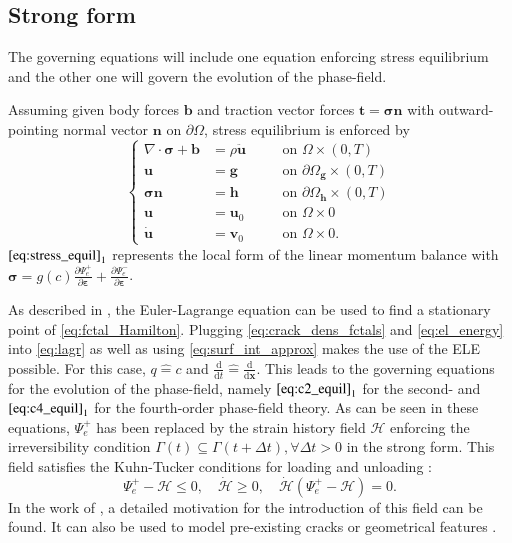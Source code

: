 \subsection{Strong form} \label{sec:strong_form}
The governing equations will include one equation enforcing stress equilibrium and the other one will govern the evolution of the phase-field.

Assuming given body forces $\mathbf{b}$ and traction vector forces $\mathbf{t}=\bm{\sigma}\mathbf{n}$ with outward-pointing normal vector $\mathbf{n}$ on $\partial\Omega$, stress equilibrium is enforced by
\begin{equation} \label{eq:stress_equil}
	 \left\{\begin{alignedat}{2}
\nabla\cdot\bm{\sigma}+\mathbf{b} &= \rho\ddot{\mathbf{u}} && \quad\text{on } \Omega\times\left(0,T\right) \\
		\mathbf{u} &= \mathbf{g} && \quad\text{on } \partial\Omega_{\mathbf{g}}\times\left(0,T\right) \\
		\bm{\sigma}\mathbf{n} &= \mathbf{h} && \quad\text{on } \partial\Omega_{\mathbf{h}}\times\left(0,T\right) \\
		\mathbf{u} &= \mathbf{u}_{0} && \quad\text{on } \Omega\times0 \\
		\dot{\mathbf{u}} &= \mathbf{v}_{0} && \quad\text{on } \Omega\times0.
  \end{alignedat}\right.
\end{equation}
$\eqref{eq:stress_equil}_{1}$ represents the local form of the linear momentum balance with $\bm{\sigma}=g\left(c\right)\frac{\partial\Psi_{e}^{+}}{\partial\bm{\varepsilon}}+\frac{\partial\Psi_{e}^{-}}{\partial\bm{\varepsilon}}$.

As described in , the Euler-Lagrange equation can be used to find a stationary point of \eqref{eq:fctal_Hamilton}. Plugging \eqref{eq:crack_dens_fctals} and \eqref{eq:el_energy} into \eqref{eq:lagr} as well as using \eqref{eq:surf_int_approx} makes the use of the ELE possible. For this case, $q\hat{=}c$ and $\frac{\mathrm{d}}{\mathrm{d}t}\hat{=}\frac{\mathrm{d}}{\mathrm{d}\mathbf{x}}$. This leads to the governing equations for the evolution of the phase-field, namely $\eqref{eq:c2_equil}_{1}$ for the second- and $\eqref{eq:c4_equil}_{1}$ for the fourth-order phase-field theory. As can be seen in these equations, $\Psi_{e}^{+}$ has been replaced by the strain history field $\mathcal{H}$ enforcing the irreversibility condition $\Gamma\left(t\right)\subseteq\Gamma\left(t+\Delta t\right), \forall \Delta t>0$ in the strong form. This field satisfies the Kuhn-Tucker conditions for loading and unloading \cite{01_PF_dyn_brittle}:
\begin{equation} \label{eq:KuhnTucker}
	\Psi_{e}^{+}-\mathcal{H}\leq0, \quad \dot{\mathcal{H}}\geq0, \quad \dot{\mathcal{H}}\left(\Psi_{e}^{+}-\mathcal{H}\right)=0.
\end{equation}
In the work of \citet{04_B_VarBrittleProve2}, a detailed motivation for the introduction of this field can be found. It can also be used to model pre-existing cracks or geometrical features \cite{01_PF_dyn_brittle}.

